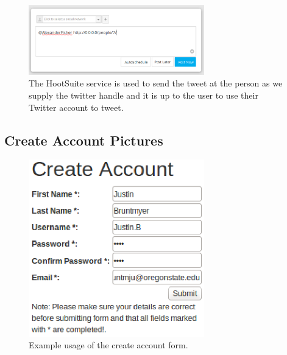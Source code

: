 \documentclass[draftclsnofoot,10pt,onecolumn]{IEEEtran} %
\begin{document}
\begin{figure}[H]
  \begin{center}
  
  \includegraphics[width=3in, frame]{tweet_person2}
  	\captionsetup{width=.4\linewidth}
  \centering
  \caption{The HootSuite service is used to send the tweet at the person as we supply the twitter handle and it is up to the user to use their Twitter account to tweet.}

  \end{center}
\end{figure}

\subsection{Create Account Pictures}

\begin{figure}[H]
  \begin{center}
  
  \includegraphics[width=3in, frame]{createAccountForm}
  \captionsetup{width=.4\linewidth}
  \centering
  \caption{Example usage of the create account form. }

  \end{center}
\end{figure}
\end{document}
